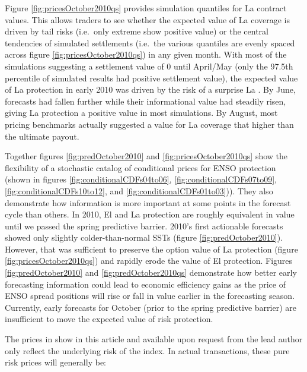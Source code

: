 \documentclass[article]{jss}
\begin{document}
Figure \ref{fig:pricesOctober2010qs} provides simulation quantiles for
La  contract values. This allows traders to see whether the
expected value of La  coverage is driven by tail risks
(i.e.~only extreme show positive value) or the central tendencies of
simulated settlements (i.e.~the various quantiles are evenly spaced
across figure \ref{fig:pricesOctober2010qs}) in any given month. With
most of the simulations suggesting a settlement value of 0 until
April/May (only the 97.5th percentile of simulated results had positive
settlement value), the expected value of La  protection in
early 2010 was driven by the risk of a surprise La . By
June, forecasts had fallen further while their informational value had
steadily risen, giving La  protection a positive value in
most simulations. By August, most pricing benchmarks actually suggested
a value for La  coverage that higher than the ultimate
payout.

Together figures \ref{fig:predOctober2010} and
\ref{fig:pricesOctober2010qs} show the flexibility of a stochastic
catalog of conditional prices for ENSO protection (shown in figures
\ref{fig:conditionalCDFs04to06}, \ref{fig:conditionalCDFs07to09},
\ref{fig:conditionalCDFs10to12}, and \ref{fig:conditionalCDFs01to03})).
They also demonstrate how information is more important at some points
in the forecast cycle than others. In 2010, El  and La
 protection are roughly equivalent in value until we passed
the spring predictive barrier. 2010's first actionable forecasts showed
only slightly colder-than-normal SSTs (figure
\ref{fig:predOctober2010}). However, that was sufficient to preserve the
option value of La  protection (figure
\ref{fig:pricesOctober2010qs}) and rapidly erode the value of El
 protection. Figures \ref{fig:predOctober2010} and
\ref{fig:predOctober2010qs} demonstrate how better early forecasting
information could lead to economic efficiency gains as the price of ENSO
spread positions will rise or fall in value earlier in the forecasting
season. Currently, early forecasts for October (prior to the spring
predictive barrier) are insufficient to move the expected value of risk
protection.

The prices in show in this article and available upon request from the
lead author only reflect the underlying risk of the index. In actual
transactions, these pure risk prices will generally be:
\end{document}
